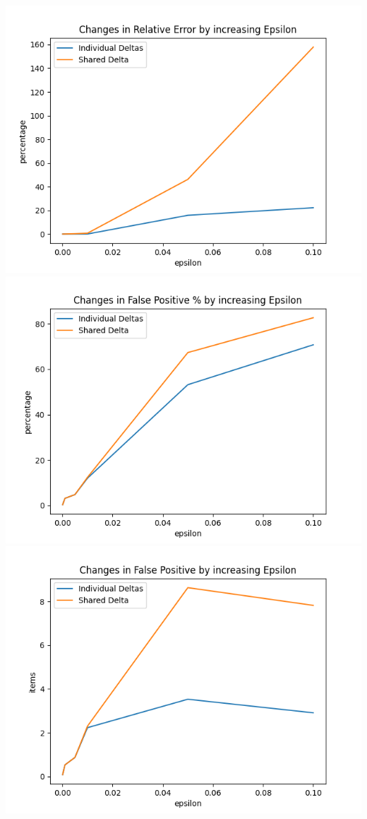 \documentclass[...]{revdetua}
\begin{document}
\includegraphics[scale=0.5]{relative.png}
\includegraphics[scale=0.5]{false positive percent.png}
\includegraphics[scale=0.5]{false positive.png}
\end{document}
